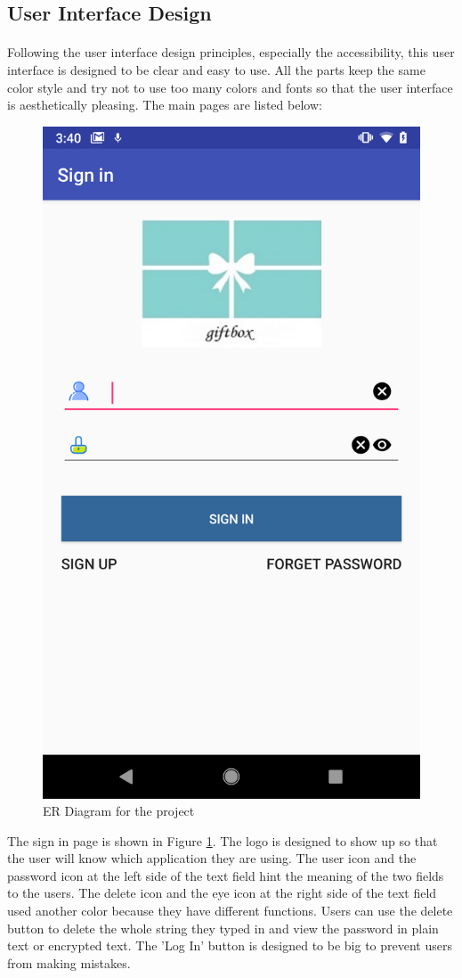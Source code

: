 \subsection{User Interface Design}
\paragraph{}Following the user interface design principles, especially the accessibility, this user interface is designed to be clear and easy to use. All the parts keep the same color style and try not to use too many colors and fonts so that the user interface is aesthetically pleasing. The main pages are listed below:
\begin{figure}[htb]
\centering
\includegraphics[width=.5\textwidth]{section03/assets/SignIn.png}
\caption[Short Caption 2]{\label{SignInUI}ER Diagram for the project}
\end{figure}
\par The sign in page is shown in Figure \ref{SignInUI}. The logo is designed to show up so that the user will know which application they are using. The user icon and the password icon at the left side of the text field hint the meaning of the two fields to the users. The delete icon and the eye icon at the right side of the text field used another color because they have different functions. Users can use the delete button to delete the whole string they typed in and view the password in plain text or encrypted text. The 'Log In' button is designed to be big to prevent users from making mistakes. 

